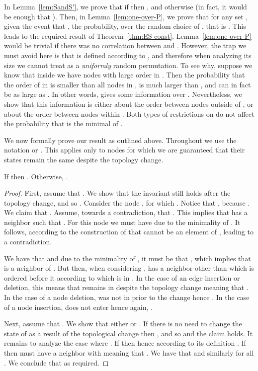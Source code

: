 In Lemma~\ref{lem:SandS'}, we prove that if  then , and otherwise  (in fact, it would be enough that ). Then, in Lemma~\ref{lem:one-over-P}, we prove that for any set , given the event that , the probability, over the random choice of , that  is . This leads to the required result of Theorem~\ref{thm:ES-const}.
Lemma~\ref{lem:one-over-P} would be trivial if there was no correlation between  and . However, the trap we must avoid here is that  is defined according to , and therefore when analyzing its size we cannot treat  as a \emph{uniformly} random permutation. To see why, suppose we know that inside  we have nodes with large order in . Then the probability that the order of  in  is smaller than all nodes in , is much larger than , and can in fact be as large as . In other words,  gives some information over . Nevertheless, we show that this information is either about the order between nodes outside of , or about the order between nodes within . Both types of restrictions on  do not affect the probability that  is the minimal of .



We now formally prove our result as outlined above. Throughout we use the notation  or . This applies only to nodes  for which we are guaranteed that their states remain the same despite the topology change.
\begin{lem}
\label{lem:SandS'}
If  then . Otherwise, .
\end{lem}
\begin{proof}
First, assume that . We show that the \MIS invariant still holds after the topology change, and so .
Consider the node , for which . Notice that , because . We claim that . Assume, towards a contradiction, that . This implies that  has a neighbor  such that . For this node  we must have  due to the minimality of . It follows, according to the construction of  that  cannot be an element of , leading to a contradiction.

We have that  and due to the minimality of , it must be that , which implies that  is a neighbor of . But then, when considering ,  has a neighbor other than  which is ordered before it according to  which is in . In the case of an edge insertion or deletion, this means that  remains in  despite the topology change meaning that . In the case of a node deletion,  was not in  prior to the change hence . In the case of a node insertion,  does not enter  hence again, .

Next, assume that . We show that either  or .
If there is no need to change the state of  as a result of the topological change then , and so  and the claim holds. It remains to analyze the case where . 
If  then  hence according to its definition . If  then  must have a neighbor  with  meaning that . We have that  and similarly  for all . We conclude that  as required.
\end{proof}

